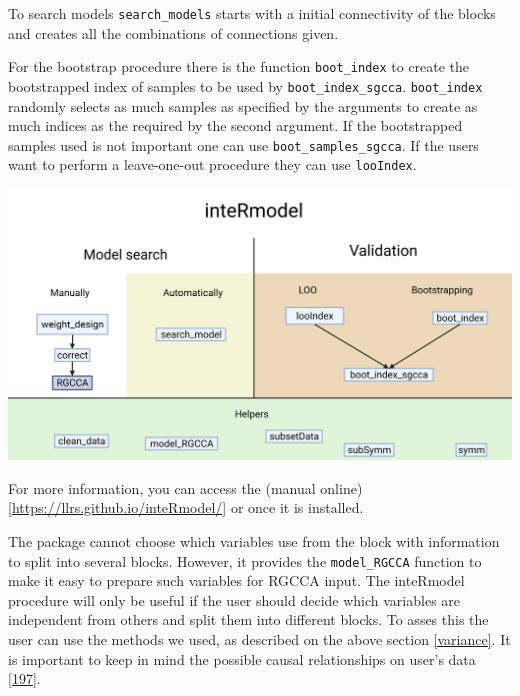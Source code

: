 \documentclass[
  a4paper,
]{book}
\let\origfigure\figure
\let\endorigfigure\endfigure
\renewenvironment{figure}[1][2] {
    \expandafter\origfigure\expandafter[!ht]
} {
    \endorigfigure
}
\begin{document}
To search models \texttt{search\_models} starts with a initial connectivity of the blocks and creates all the combinations of connections given.

For the bootstrap procedure there is the function \texttt{boot\_index} to create the bootstrapped index of samples to be used by \texttt{boot\_index\_sgcca}.
\texttt{boot\_index} randomly selects as much samples as specified by the arguments to create as much indices as the required by the second argument.
If the bootstrapped samples used is not important one can use \texttt{boot\_samples\_sgcca}.
If the users want to perform a leave-one-out procedure they can use \texttt{looIndex}.

\begin{figure}
\includegraphics[width=1\linewidth]{images/inteRmodel-workflows} \caption[inteRmodel functions and workflow.]{Functions provided by the inteRmodel package to search and validate models of relationships using RGCCA. Created with BioRender.com}\label{fig:intermodel-workflows}
\end{figure}

For more information, you can access the (manual online){[}\url{https://llrs.github.io/inteRmodel/}{]} or once it is installed.

The package cannot choose which variables use from the block with information to split into several blocks.
However, it provides the \texttt{model\_RGCCA} function to make it easy to prepare such variables for RGCCA input.
The inteRmodel procedure will only be useful if the user should decide which variables are independent from others and split them into different blocks.
To asses this the user can use the methods we used, as described on the above section \ref{variance}.
It is important to keep in mind the possible causal relationships on user's data {[}\protect\hyperlink{ref-greenland2002}{197}{]}.
\end{document}
